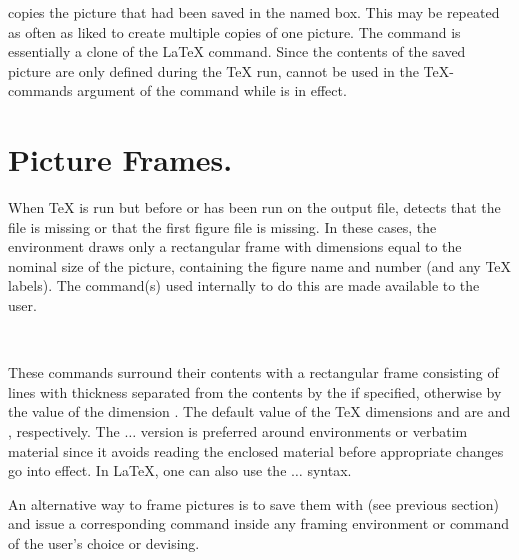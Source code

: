 \documentclass[letterpaper]{article}
\begin{document}
 copies the picture that had been saved in the named box.
This may be repeated as often as liked to create multiple copies of one
picture. The  command is essentially a clone of the \LaTeX{}
 command. Since the contents of the saved picture are only
defined during the \TeX{} run,  cannot be used in the
\TeX-commands argument of the  command while 
is in effect.


\section{Picture Frames.}\label{frames}

When \TeX{} is run but before \MF{} or \MP{} has been run on the output
file, \mfp{} detects that the  file is missing or that
the first \MP{} figure file  is missing. In these
cases, the  environment draws only a rectangular frame with
dimensions equal to the nominal size of the picture, containing the
figure name and number (and any \TeX{} labels). The command(s) used
internally to do this are made available to the user.

\begin{cd}
%
\\
%
%
%
\end{cd}

These commands surround their contents with a rectangular frame
consisting of lines with thickness  separated from
the contents by the  if specified, otherwise by the value of
the dimension . The default value of the \TeX{}
dimensions  and  are \dim{2pt} and
\dim{0.4pt}, respectively. The  $\ldots$ 
version is preferred around  environments or verbatim
material since it avoids reading the enclosed material before
appropriate  changes go into effect. In \LaTeX{}, one can
also use the  $\ldots$ 
syntax.

An alternative way to frame  pictures is to save them with
 (see previous section) and issue a corresponding
 command inside any framing environment or command of the user's
choice or devising.
\end{document}
